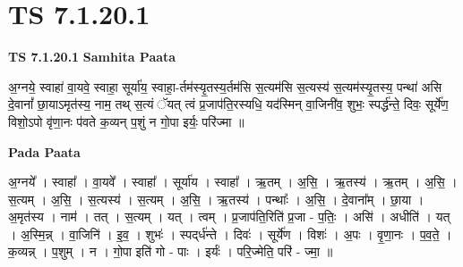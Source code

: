 \documentclass[17pt]{extarticle}
\begin{document}
\section*{ TS 7.1.20.1 }

\textbf{TS 7.1.20.1 } \newline
\textbf{Samhita Paata} \newline

अ॒ग्नये॒ स्वाहा॑ वा॒यवे॒ स्वाहा॒ सूर्या॑य॒ स्वाहा॒-र्तम॑स्यृ॒तस्य॒र्तम॑सि स॒त्यम॑सि स॒त्यस्य॑ स॒त्यम॑स्यृ॒तस्य॒ पन्था॑ असि दे॒वानां᳚ छा॒याऽमृत॑स्य॒ नाम॒ तथ् स॒त्यं ॅयत् त्वं प्र॒जाप॑ति॒रस्यधि॒ यद॑स्मिन् वा॒जिनी॑व॒ शुभः॒ स्पर्द्ध॑न्ते॒ दिवः॒ सूर्ये॑ण॒ विशो॒ऽपो वृ॑णा॒नः प॑वते क॒व्यन् प॒शुं न गो॒पा इर्यः॒ परि॑ज्मा ॥ \newline

\textbf{Pada Paata} \newline

अ॒ग्नये᳚ । स्वाहा᳚ । वा॒यवे᳚ । स्वाहा᳚ । सूर्या॑य । स्वाहा᳚ । ऋ॒तम् । अ॒सि॒ । ऋ॒तस्य॑ । ऋ॒तम् । अ॒सि॒ । स॒त्यम् । अ॒सि॒ । स॒त्यस्य॑ । स॒त्यम् । अ॒सि॒ । ऋ॒तस्य॑ । पन्थाः᳚ । अ॒सि॒ । दे॒वाना᳚म् । छा॒या । अ॒मृत॑स्य । नाम॑ । तत् । स॒त्यम् । यत् । त्वम् । प्र॒जाप॑ति॒रिति॑ प्र॒जा - प॒तिः॒ । असि॑ । अधीति॑ । यत् । अ॒स्मि॒न्न् । वा॒जिनि॑ । इ॒व॒ । शुभः॑ । स्पद्‌र्ध॑न्ते । दिवः॑ । सूर्ये॑ण । विशः॑ । अ॒पः । वृ॒णा॒नः । प॒व॒ते॒ । क॒व्यन्न् । प॒शुम् । न । गो॒पा इति॑ गो - पाः । इर्यः॑ । परि॒ज्मेति॒ परि॑ - ज्मा॒ ॥  \newline
\end{document}
